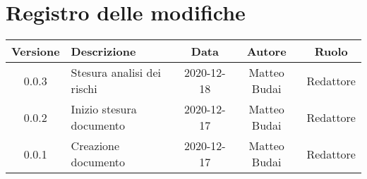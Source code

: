\section*{Registro delle modifiche}

\begin{center}
	\begin{longtable}{|c|p{5cm}|c|c|c|}
	\hline
	\rowcolor{lighter-grayer}
	\textbf{Versione} & \textbf{Descrizione} & \textbf{Data} & \textbf{Autore} & \textbf{Ruolo} \\
	\hline
	\endfirsthead

	0.0.3 & Stesura analisi dei rischi & 2020-12-18 & Matteo Budai & Redattore \\
	\hline
	0.0.2 & Inizio stesura documento & 2020-12-17 & Matteo Budai & Redattore \\
	\hline
	0.0.1 & Creazione documento & 2020-12-17 & Matteo Budai & Redattore \\
	\hline

	\end{longtable}
\end{center}